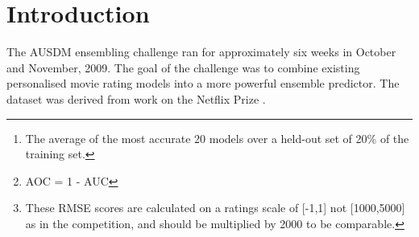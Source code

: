 \documentclass{article}
\begin{document}
 


\begin{abstract} 

Up to 1151 ``black box'' movie recommendation models were combined into an ensemble predictor.  Significant success was achieved on the binary AUC task, using a deep neural network, a gated classifier and multiple logistic regression.  Further improvement was achieved by adding hand-coded features, and by modelling the joint distribution of the movie models using a SVD and denoising auto-encoders.

On the large AUC task, the baseline\footnote{The average of the most accurate 20 models over a held-out set of 20\% of the training set.}  AOC\footnote{AOC = 1 - AUC} performance of 0.1635 was improved to 0.1461.  On the more difficult medium task, the baseline performance of 0.3384 was improved to 0.3144, and on the small task, the already low baseline of 0.0597 was slightly improved to 0.0571.

Less success was achieved on the regression RMSE task.  The best result, on the large task, reduced the baseline of 0.4419 to 0.4385\footnote{These RMSE scores are calculated on a ratings scale of [-1,1] not [1000,5000] as in the competition, and should be multiplied by 2000 to be comparable.}.

The ``black box'' nature of the competition and the underlying noise in the labels (to which the RMSE score is particularly sensitive) make progress difficult.  An alternative framework for ensembling is discussed which, whilst placing more requirements on model builders, would likely lead to better improvement in the ensembles.

\end{abstract}

\section{Introduction}

The AUSDM ensembling challenge ran for approximately six weeks in October and November, 2009.  The goal of the challenge was to combine existing personalised movie rating models into a more powerful ensemble predictor.  The dataset was derived from work on the Netflix Prize \cite{NetFlixPrize}.
\end{document}
